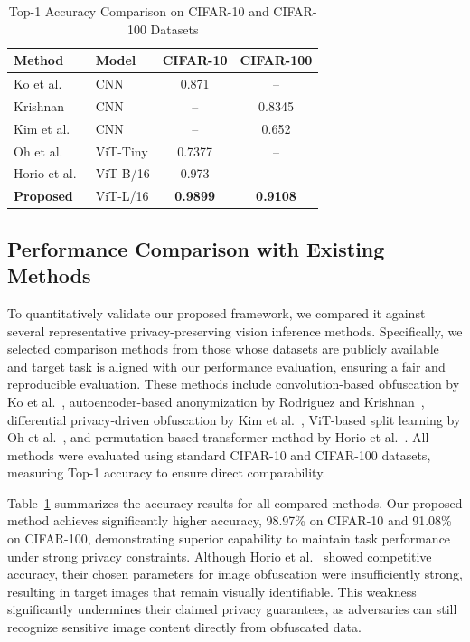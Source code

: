 \documentclass{ieeeaccess}
\begin{document}
\begin{table}[t!]
\centering
\caption{Top-1 Accuracy Comparison on CIFAR-10 and CIFAR-100 Datasets}
\label{tab:accuracy-comparison}
\begin{tabular}{l l c c}
\toprule
\textbf{Method} & \textbf{Model} & \textbf{CIFAR-10} & \textbf{CIFAR-100} \\
\midrule
Ko et al.~\cite{9129656}       & CNN           & 0.871   & --      \\
Krishnan~\cite{10.1007/978-3-031-37586-6_18}        & CNN           & --      & 0.8345  \\
Kim et al.~\cite{s24103166}      & CNN           & --      & 0.652   \\
Oh et al.~\cite{oh2022differentially}       & ViT-Tiny      & 0.7377  & --      \\
Horio et al.~\cite{horio2024privacypreservingvisiontransformerusing} & ViT-B/16      & 0.973   & --      \\
\textbf{Proposed} & ViT-L/16    & \textbf{0.9899} & \textbf{0.9108} \\
\bottomrule
\end{tabular}
\end{table}



\subsection{Performance Comparison with Existing Methods}\label{sec:comparison}

To quantitatively validate our proposed framework, we compared it against several representative privacy-preserving vision inference methods. Specifically, we selected comparison methods from those whose datasets are publicly available and target task is aligned with our performance evaluation, ensuring a fair and reproducible evaluation. These methods include convolution-based obfuscation by Ko et al.~\cite{9129656}, autoencoder-based anonymization by Rodriguez and Krishnan~\cite{10.1007/978-3-031-37586-6_18}, differential privacy-driven obfuscation by Kim et al.~\cite{s24103166}, ViT-based split learning by Oh et al.~\cite{oh2022differentially}, and permutation-based transformer method by Horio et al.~\cite{horio2024privacypreservingvisiontransformerusing}. All methods were evaluated using standard CIFAR-10 and CIFAR-100 datasets, measuring Top-1 accuracy to ensure direct comparability.

Table~\ref{tab:accuracy-comparison} summarizes the accuracy results for all compared methods. Our proposed method achieves significantly higher accuracy, 98.97\% on CIFAR-10 and 91.08\% on CIFAR-100, demonstrating superior capability to maintain task performance under strong privacy constraints. Although Horio et al.~\cite{horio2024privacypreservingvisiontransformerusing} showed competitive accuracy, their chosen parameters for image obfuscation were insufficiently strong, resulting in target images that remain visually identifiable. This weakness significantly undermines their claimed privacy guarantees, as adversaries can still recognize sensitive image content directly from obfuscated data.
\end{document}
